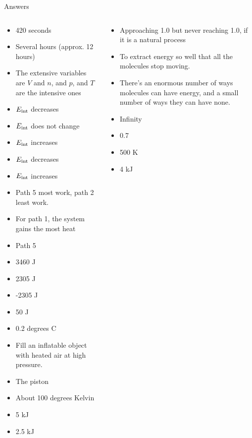 \documentclass{beamer}
\begin{document}
\begin{frame}{Answers}
\tiny
\begin{columns}[T]
\begin{column}{0.5\textwidth}
\begin{itemize}
\item 420 seconds
\item Several hours (approx. 12 hours)
\item The extensive variables are $V$ and $n$, and $p$, and $T$ are the intensive ones
\item $E_{\rm int}$ decreases
\item $E_{\rm int}$ does not change
\item $E_{\rm int}$ increases
\item $E_{\rm int}$ decreases
\item $E_{\rm int}$ increases
\item Path 5 most work, path 2 least work.
\item For path 1, the system gains the most heat
\item Path 5
\item 3460 J
\item 2305 J
\item -2305 J
\item 50 J
\item 0.2 degrees C
\item Fill an inflatable object with heated air at high pressure.
\item The piston
\item About 100 degrees Kelvin
\item 5 kJ
\item 2.5 kJ
\end{itemize}
\end{column}
\begin{column}{0.5\textwidth}
\begin{itemize}
\item Approaching 1.0 but never reaching 1.0, if it is a natural process
\item To extract energy so well that all the molecules stop moving.
\item There's an enormous number of ways molecules can have energy, and a small number of ways they can have none.
\item Infinity
\item 0.7
\item 500 K
\item 4 kJ
\end{itemize}
\end{column}
\end{columns}
\end{frame}
\end{document}
